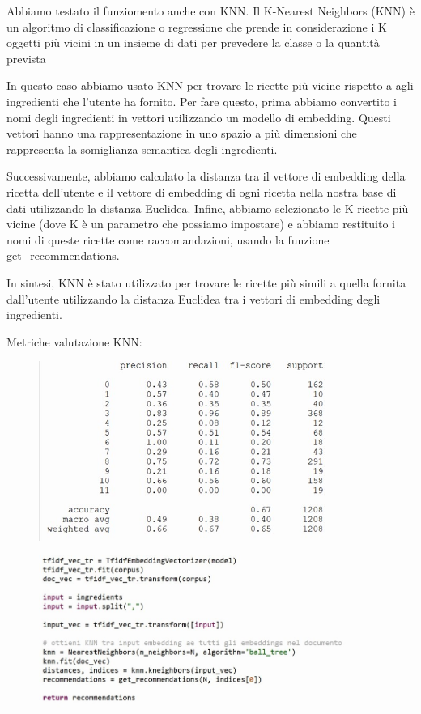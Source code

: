 \documentclass[12pt]{report}
\begin{document}
Abbiamo testato il funziomento anche con  KNN.
Il K-Nearest Neighbors (KNN) è un algoritmo di classificazione o regressione che prende in considerazione i K oggetti più vicini in un insieme di dati per prevedere la classe o la quantità prevista

In questo caso abbiamo usato KNN per trovare le ricette più vicine rispetto a agli ingredienti che l'utente ha fornito. Per fare questo, prima abbiamo convertito i nomi degli ingredienti in vettori utilizzando un modello di embedding. Questi vettori hanno una rappresentazione in uno spazio a più dimensioni che rappresenta la somiglianza semantica degli ingredienti.

Successivamente, abbiamo calcolato la distanza tra il vettore di embedding della ricetta dell'utente e il vettore di embedding di ogni ricetta nella nostra base di dati utilizzando la distanza Euclidea. Infine, abbiamo selezionato le K ricette più vicine (dove K è un parametro che possiamo impostare) e abbiamo restituito i nomi di queste ricette come raccomandazioni, usando la funzione get\_recommendations.

In sintesi, KNN è stato utilizzato per trovare le ricette più simili a quella fornita dall'utente utilizzando la distanza Euclidea tra i vettori di embedding degli ingredienti.

Metriche valutazione KNN:

\begin{figure}[H]
        \centering
        {\includegraphics[width=0.9\textwidth]{img/img21.jpg}}
\end{figure}

\begin{figure}[H]
        \centering
        {\includegraphics[width=0.9\textwidth]{img/img17.jpg}}
\end{figure}
\end{document}
